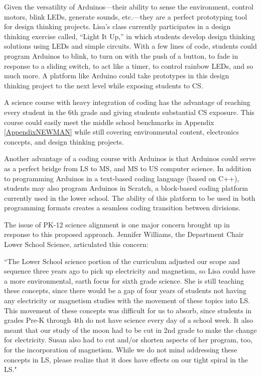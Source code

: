 Given the versatility of Arduinos---their ability to sense the environment, control motors, blink LEDs, generate sounds, etc.---they are a perfect prototyping tool for design thinking projects. Lisa's class currently participates in a design thinking exercise called, ``Light It Up,'' in which students develop design thinking solutions using LEDs and simple circuits. With a few lines of code, students could program Arduinos to blink, to turn on with the push of a button, to fade in response to a sliding switch, to act like a timer, to control rainbow LEDs, and so much more. A platform like Arduino could take prototypes in this design thinking project to the next level while exposing students to CS.\par
A science course with heavy integration of coding has the advantage of reaching every student in the 6th grade and giving students substantial CS exposure. This course could easily meet the middle school benchmarks in Appendix \ref{AppendixNEWMAN} while still covering environmental content, electronics concepts, and design thinking projects.\par 
Another advantage of a coding course with Arduinos is that Arduinos could serve as a perfect bridge from LS to MS, and MS to US computer science. In addition to programming Arduinos in a text-based coding language (based on C++), students may also program Arduinos in Scratch, a block-based coding platform currently used in the lower school. The ability of this platform to be used in both programming formats creates a seamless coding transition between divisions.\par
The issue of PK-12 science alignment is one major concern brought up in response to this proposed approach. Jennifer Williams, the Department Chair Lower School Science, articulated this concern: 
\begin{blockquote} ``The Lower School science portion of the curriculum adjusted our scope and sequence three years ago to pick up electricity and magnetism, so Lisa could have a more environmental, earth focus for sixth grade science. She is still teaching these concepts, since there would be a gap of four years of students not having any electricity or magnetism studies with the movement of these topics into LS. This movement of these concepts was difficult for us to absorb, since students in grades Pre-K through 4th do not have science every day of a school week. It also meant that our study of the moon had to be cut in 2nd grade to make the change for electricity. Susan also had to cut and/or shorten aspects of her program, too, for the incorporation of magnetism. While we do not mind addressing these concepts in LS, please realize that it does have effects on our tight spiral in the LS."
\end{blockquote}
